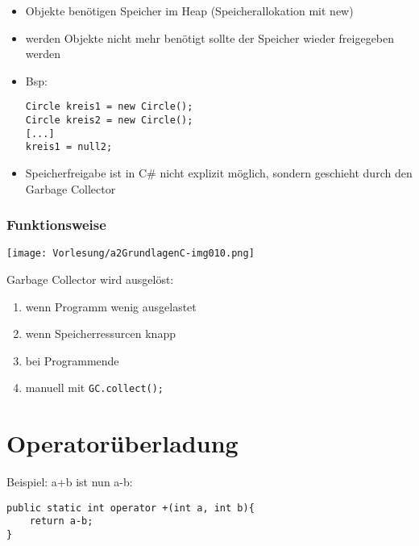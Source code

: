 \begin{itemize}
\item Objekte benötigen Speicher im Heap (Speicherallokation mit new)
\item werden Objekte nicht mehr benötigt sollte der Speicher wieder freigegeben werden
\item Bsp: 
\begin{lstlisting}[language={[Sharp]C}]
Circle kreis1 = new Circle();
Circle kreis2 = new Circle();
[...]
kreis1 = null2;
\end{lstlisting}
\item Speicherfreigabe ist in C\# nicht explizit möglich, sondern geschieht durch den Garbage Collector
\end{itemize}

\subsubsection*{Funktionsweise}
\begin{center}
\texttt{[image: Vorlesung/a2GrundlagenC-img010.png]}
\end{center}
Garbage Collector wird ausgelöst:
\begin{enumerate}
\item wenn Programm wenig ausgelastet
\item wenn Speicherressurcen knapp
\item bei Programmende
\item manuell mit \lstinline$GC.collect();$
\end{enumerate}

\section{Operatorüberladung}
Beispiel: a+b ist nun a-b:
\begin{lstlisting}[language={[Sharp]C}]
public static int operator +(int a, int b){
	return a-b;
}
\end{lstlisting}